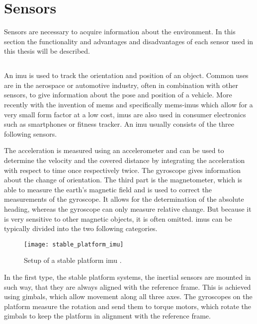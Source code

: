 \section{Sensors}
\label{sec:sensors}
Sensors are necessary to acquire information about the environment.
In this section the functionality and advantages and disadvantages of each sensor used in this thesis will be described.

\subsection{}
An \gls{imu} is used to track the orientation and position of an object.
Common uses are in the aerospace or automotive industry, often in combination with other sensors, to give information about the pose and position of a vehicle.
More recently with the invention of \gls{mems} and specifically \gls{mems}-\glspl{imu} which allow for a very small form factor at a low cost, \glspl{imu} are also used in consumer electronics such as smartphones or fitness tracker.
An \gls{imu} usually consists of the three following sensors.\par
The acceleration is measured using an accelerometer and can be used to determine the velocity and the covered distance by integrating the acceleration with respect to time once respectively twice.
The gyroscope gives information about the change of orientation.
The third part is the magnetometer, which is able to measure the earth's magnetic field and is used to correct the measurements of the gyroscope.
It allows for the determination of the absolute heading, whereas the gyroscope can only measure relative change. But because it is very sensitive to other magnetic objects, it is often omitted.
\glspl{imu} can be typically divided into the two following categories.\par
\begin{figure}[h]
	\centering
	\texttt{[image: stable\_platform\_imu]}
	\caption[Setup of a stable platform \acrshort{imu}]{Setup of a stable platform \acrshort{imu} \cite{Woodman2007}.}
	\label{fig:stable_platform_imu}
\end{figure}
In the first type, the stable platform systems, the inertial sensors are mounted in such way, that they are always aligned with the reference frame.
This is achieved using gimbals, which allow movement along all three axes.
The gyroscopes on the platform measure the rotation and send them to torque motors, which rotate the gimbals to keep the platform in alignment with the reference frame.
